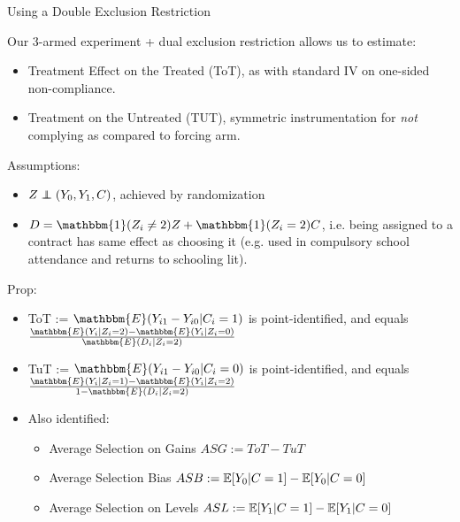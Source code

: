 \documentclass[8pt]{beamer}
\begin{document}
   









 
\begin{frame}{Using a Double Exclusion Restriction}

Our 3-armed experiment + dual exclusion restriction allows us to estimate: 
\begin {itemize}
 \item Treatment Effect on the Treated (ToT), as with standard IV on one-sided non-compliance.
 \item Treatment on the Untreated (TUT), symmetric instrumentation for \textit{not} complying as compared to forcing arm.
\end{itemize}
\vspace{.2in}


Assumptions:

\begin{itemize}
    \item $Z \independent (Y_0,Y_1,C)$, achieved by randomization
    \item $D = \mathbbm{1}(Z_i \neq 2) Z + \mathbbm{1}(Z_i=2) C$, i.e. \alert{being assigned to a contract has same effect as choosing it} (e.g. used in compulsory school attendance and returns to schooling lit).
\end{itemize}

\vspace{.2in}

Prop:
\begin{itemize}
    \item ToT := $\mathbbm{E}(Y_{i1} - Y_{i0} | C_i = 1)$ is point-identified, and equals $\frac{\mathbbm{E}(Y_i|Z_i=2) - \mathbbm{E}(Y_i|Z_i =0)}{\mathbbm{E}(D_i|Z_i=2)} $
     \item TuT := $\mathbbm{E}(Y_{i1} - Y_{i0} | C_i = 0)$ is point-identified, and equals $\frac{\mathbbm{E}(Y_i|Z_i=1) - \mathbbm{E}(Y_i|Z_i =2)}{1-\mathbbm{E}(D_i|Z_i=2)} $
     \item Also identified: 
     \begin{itemize}
         \item Average Selection on Gains $ASG:=ToT-TuT$
         \item Average Selection Bias $ASB:= \mathbb{E}[Y_0 | C=1]-\mathbb{E}[Y_0 | C=0]$
         \item Average Selection on Levels $ASL:= \mathbb{E}[Y_1 | C=1]-\mathbb{E}[Y_1 | C=0]$
     \end{itemize}
\end{itemize}
\end{frame}
\end{document}
